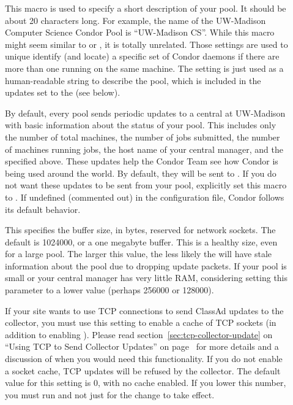 \begin{description}
\item[] \label{param:CollectorName}
  This macro is used to specify a short description of your pool.
  It should be about 20 characters long.  For example, the name of the
  UW-Madison Computer Science Condor Pool is ``UW-Madison CS''.  
  While this macro might seem similar to  or
  , it is totally unrelated.
  Those settings are used to unique identify (and locate) a specific
  set of Condor daemons if there are more than one running on the same
  machine.
  The  setting is just used as a
  human-readable string to describe the pool, which is included in the
  updates set to the  (see
  below). 

\item[]
  \label{param:CondorDevelopersCollector} By default, every pool sends
  periodic updates to a central  at UW-Madison with
  basic information about the status of your pool.  This includes only
  the number of total machines, the number of jobs submitted, the
  number of machines running jobs, the host name of your central
  manager, and the  specified above.  These
  updates help the Condor Team see how Condor is being used around the world.
  By default, they will be sent to .
  If you do not want
  these updates to be sent from your pool,
  explicitly set this macro to . 
  If undefined (commented out) in the configuration file, Condor follows
  its default behavior.

\item[] 
  \label{param:CollectorSocketBufsize} This specifies the buffer size, in
  bytes, reserved for  network sockets.  The default is
  1024000, or a one megabyte buffer.  This is a healthy size, even for a large
  pool.  The larger this value, the less likely the  will
  have stale information about the pool due to dropping update packets.  If
  your pool is small or your central manager has very little RAM, considering
  setting this parameter to a lower value (perhaps 256000 or 128000).

\item[] 
  \label{param:CollectorSocketCacheSize} 
  If your site wants to use TCP connections to send ClassAd updates to
  the collector, you must use this setting to enable a cache of TCP
  sockets (in addition to enabling
  ). 
  Please read section~\ref{sec:tcp-collector-update} on ``Using TCP to
  Send Collector Updates'' on page~\pageref{sec:tcp-collector-update}
  for more details and a discussion of when you would need this
  functionality. 
  If you do not enable a socket cache, TCP updates will be refused by
  the collector.
  The default value for this setting is 0, with no cache enabled.   
  If you lower this number, you must run  and not just
   for the change to take effect.


\end{description}
